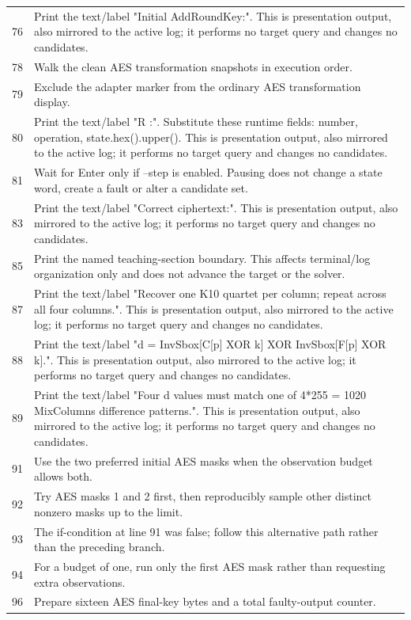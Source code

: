 \begin{longtable}{r >{\raggedright\arraybackslash}p{138mm}}
76&Print the text/label "Initial AddRoundKey:". This is presentation output, also mirrored to the active log; it performs no target query and changes no candidates.\\
78&Walk the clean AES transformation snapshots in execution order.\\
79&Exclude the adapter marker from the ordinary AES transformation display.\\
80&Print the text/label "R   :". Substitute these runtime fields: number, operation, state.hex().upper(). This is presentation output, also mirrored to the active log; it performs no target query and changes no candidates.\\
81&Wait for Enter only if --step is enabled. Pausing does not change a state word, create a fault or alter a candidate set.\\
83&Print the text/label "Correct ciphertext:". This is presentation output, also mirrored to the active log; it performs no target query and changes no candidates.\\
85&Print the named teaching-section boundary. This affects terminal/log organization only and does not advance the target or the solver.\\
87&Print the text/label "Recover one K10 quartet per column; repeat across all four columns.". This is presentation output, also mirrored to the active log; it performs no target query and changes no candidates.\\
88&Print the text/label "d = InvSbox[C[p] XOR k] XOR InvSbox[F[p] XOR k].". This is presentation output, also mirrored to the active log; it performs no target query and changes no candidates.\\
89&Print the text/label "Four d values must match one of 4*255 = 1020 MixColumns difference patterns.". This is presentation output, also mirrored to the active log; it performs no target query and changes no candidates.\\
91&Use the two preferred initial AES masks when the observation budget allows both.\\
92&Try AES masks 1 and 2 first, then reproducibly sample other distinct nonzero masks up to the limit.\\
93&The if-condition at line 91 was false; follow this alternative path rather than the preceding branch.\\
94&For a budget of one, run only the first AES mask rather than requesting extra observations.\\
96&Prepare sixteen AES final-key bytes and a total faulty-output counter.\\

\end{longtable}
